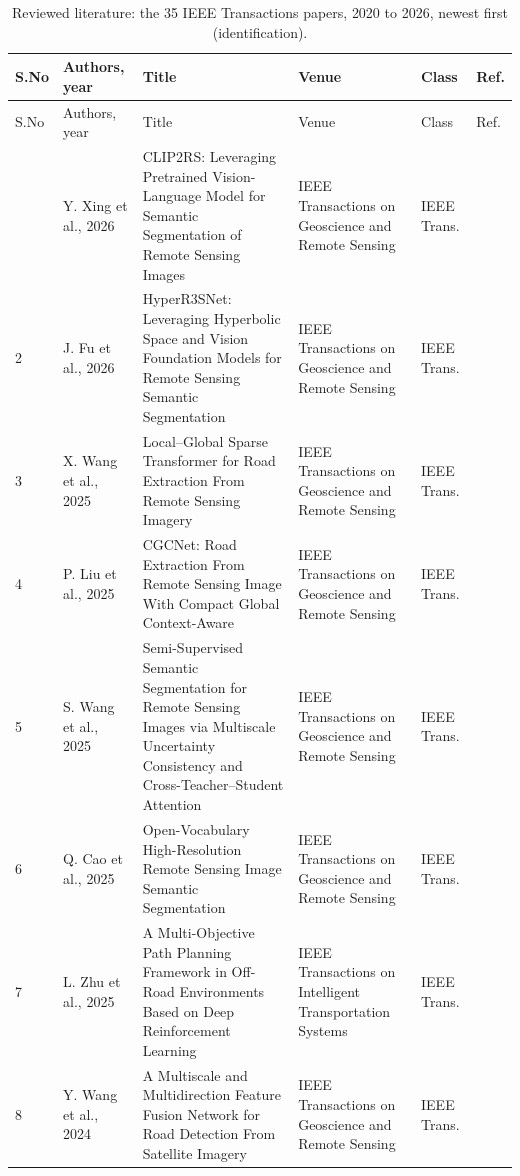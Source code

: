 \begin{landscape}
\footnotesize
\begin{longtable}{@{}L{0.6cm}L{3.4cm}L{8.2cm}L{5.6cm}L{2.0cm}L{1.2cm}@{}}
\caption{Reviewed literature: the 35 IEEE Transactions papers, 2020 to 2026, newest first (identification).}\label{tab:lit1}\\
\toprule S.No & Authors, year & Title & Venue & Class & Ref.\\\midrule\endfirsthead
\toprule S.No & Authors, year & Title & Venue & Class & Ref.\\\midrule\endhead
\bottomrule{} & Y. Xing et al., 2026 & CLIP2RS: Leveraging Pretrained Vision-Language Model for Semantic Segmentation of Remote Sensing Images & IEEE Transactions on Geoscience and Remote Sensing & IEEE Trans. & \cite{L34} \\
2 & J. Fu et al., 2026 & HyperR3SNet: Leveraging Hyperbolic Space and Vision Foundation Models for Remote Sensing Semantic Segmentation & IEEE Transactions on Geoscience and Remote Sensing & IEEE Trans. & \cite{L35} \\
3 & X. Wang et al., 2025 & Local–Global Sparse Transformer for Road Extraction From Remote Sensing Imagery & IEEE Transactions on Geoscience and Remote Sensing & IEEE Trans. & \cite{L29} \\
4 & P. Liu et al., 2025 & CGCNet: Road Extraction From Remote Sensing Image With Compact Global Context-Aware & IEEE Transactions on Geoscience and Remote Sensing & IEEE Trans. & \cite{L30} \\
5 & S. Wang et al., 2025 & Semi-Supervised Semantic Segmentation for Remote Sensing Images via Multiscale Uncertainty Consistency and Cross-Teacher–Student Attention & IEEE Transactions on Geoscience and Remote Sensing & IEEE Trans. & \cite{L31} \\
6 & Q. Cao et al., 2025 & Open-Vocabulary High-Resolution Remote Sensing Image Semantic Segmentation & IEEE Transactions on Geoscience and Remote Sensing & IEEE Trans. & \cite{L33} \\
7 & L. Zhu et al., 2025 & A Multi-Objective Path Planning Framework in Off-Road Environments Based on Deep Reinforcement Learning & IEEE Transactions on Intelligent Transportation Systems & IEEE Trans. & \cite{L41} \\
8 & Y. Wang et al., 2024 & A Multiscale and Multidirection Feature Fusion Network for Road Detection From Satellite Imagery & IEEE Transactions on Geoscience and Remote Sensing & IEEE Trans. & \cite{L16} \\

\end{longtable}
\end{landscape}
